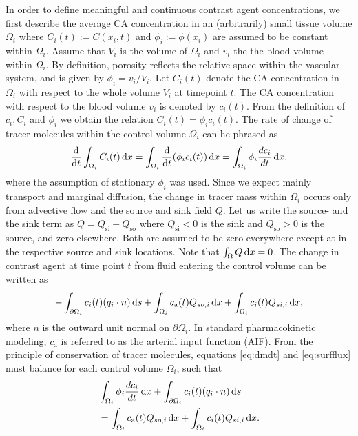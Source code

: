 \documentclass[journal,twocolumn]{IEEEtran}
\newcommand{\Qso}{Q_{\mathrm{so}}}
\newcommand{\Qsi}{Q_{\mathrm{si}}}
\newcommand{\ca}{c_\mathrm{a}}
\newcommand{\sic}{\milli\mol\per\milli\meter\cubed}
\begin{document}
	In order to define meaningful and continuous contrast agent concentrations, we first describe the average CA concentration in an (arbitrarily) small tissue volume $\Omega_i$ where $C_i(t):= C(x_i,t)$ and $\phi_i := \phi(x_i)$ are assumed to be constant within $\Omega_i$.
	Assume that $V_i$ is the volume of $\Omega_i$ and $v_i$ the the blood volume within $\Omega_i$.
	By definition, porosity reflects the relative space within the vascular system, and is given by $\phi_i = v_i/V_i$.
	Let $C_i(t)$ denote the CA concentration in $\Omega_i$ with respect to the whole volume $V_i$ at timepoint $t$.
	The CA concentration with respect to the blood volume $v_i$ is denoted by $c_i(t)$.
	From the definition of $c_i,C_i$ and $\phi_i$ we obtain the relation $C_i(t) = \phi_i  c_i(t)$.
	The rate of change of tracer molecules within the control volume $\Omega_i$ can he phrased as
	\begin{equation}
		\diffop{t}\int_{\Omega_i}C_i(t) \diffint x = \int_{\Omega_i}\diffop{t}(\phi_i c_i(t)) \diffint x = \int_{\Omega_i} \phi_i \frac{d c_i}{dt}\diffint x.
		\label{eq:dmdt}
	\end{equation}	
	where the assumption of stationary $\phi_i$ was used.
	Since we expect mainly transport and marginal diffusion, the change in tracer mass within $\Omega_i$ occurs only from advective flow and the source and sink field $Q$.
	Let us write the source- and the sink term as $Q = \Qsi + \Qso$ where $\Qsi < 0$ is the sink and $\Qso > 0$ is the source, and zero elsewhere. 
	Both are assumed to be zero everywhere except at in the respective source and sink locations.
	Note that $\int_\Omega Q \,\mathrm{d} x = 0$. 
	The change in contrast agent at time point $t$ from fluid entering the control volume can be written as
	\begin{equation}
		-\int_{ \partial \Omega_i}c_i(t)(q_i \cdot n)\diffint s + \int_{\Omega_i}\ca(t) Q_{so,i} \diffint x + \int_{\Omega_i}c_i(t)Q_{si,i} \diffint x,
		\label{eq:surfflux}
	\end{equation}
	where $n$ is the outward unit normal on $\partial \Omega_i$.
	In standard pharmacokinetic modeling, $\ca$ is referred to as the arterial input function (AIF).
	From the principle of conservation of tracer molecules, equations \eqref{eq:dmdt} and \eqref{eq:surfflux} must balance for each control volume $\Omega_i$, such that
	\begin{align}
		& \int_{\Omega_i} \phi_i \frac{d c_i}{dt} \diffint x + \int_{ \partial \Omega_i}c_i(t)(q_i \cdot n) \diffint s \nonumber \\
		& = \int_{\Omega_i}\ca(t)Q_{so,i} \diffint x + \int_{\Omega_i}c_i(t) Q_{si,i} \diffint x.
		\label{eq:conteq}
	\end{align}
\end{document}
